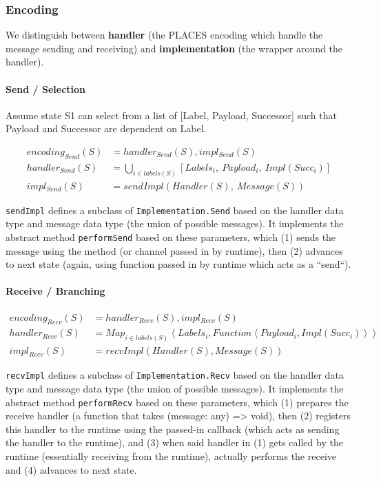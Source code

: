 \documentclass{article}
\begin{document}
\subsubsection{Encoding}
We distinguish between \textbf{handler} (the PLACES encoding which handle the
message sending and receiving) and \textbf{implementation} (the wrapper around the handler).

\paragraph{Send / Selection}
Assume state S1 can select from a list of [Label, Payload, Successor] such that Payload and Successor
are dependent on Label.

\begin{align}
encoding_{Send}(S) &= handler_{Send}(S), impl_{Send}(S) \\
handler_{Send}(S) &= \bigcup_{i \in labels(S)} [Labels_i,~Payload_i,~Impl(Succ_i)] \\
impl_{Send}(S) &= sendImpl(Handler(S),~Message(S))
\end{align}

\texttt{sendImpl} defines a subclass of \texttt{Implementation.Send} based on the handler data type
and message data type (the union of possible messages). It implements the abstract method
\texttt{performSend} based on these parameters, which (1) sends the message using
the method (or channel passed in by runtime), then (2) advances to next state (again, using
function passed in by runtime which acts as a ``send``).

\paragraph{Receive / Branching}

\begin{align}
encoding_{Recv}(S) &= handler_{Recv}(S), impl_{Recv}(S) \\
handler_{Recv}(S) &= Map_{i \in labels(S)}\left<Labels_i, Function\left<Payload_i, Impl(Succ_i)\right>\right> \\
impl_{Recv}(S) &= recvImpl(Handler(S), Message(S))
\end{align}

\texttt{recvImpl} defines a subclass of \texttt{Implementation.Recv} based on the handler data type
and message data type (the union of possible messages). It implements the abstract method
\texttt{performRecv} based on these parameters, which (1) prepares the receive handler (a function that takes
(message: any) => void), then (2) registers this handler to the runtime using the passed-in callback
(which acts as sending the handler to the runtime), and (3) when said handler in (1) gets called by the runtime
(essentially receiving from the runtime), actually performs the receive and (4) advances to next state.
\end{document}

